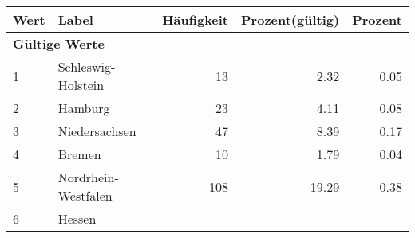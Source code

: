      \begin{longtable}{lXrrr}
     \toprule
     \textbf{Wert} & \textbf{Label} & \textbf{Häufigkeit} & \textbf{Prozent(gültig)} & \textbf{Prozent} \\
     \endhead
     \midrule
     \multicolumn{5}{l}{\textbf{Gültige Werte}}\\

     1 &
     \multicolumn{1}{X}{ Schleswig-Holstein   } &


       \num{13} &
       \num[round-mode=places,round-precision=2]{2,32} &
         \num[round-mode=places,round-precision=2]{0,05} \\

     2 &
     \multicolumn{1}{X}{ Hamburg   } &


       \num{23} &
       \num[round-mode=places,round-precision=2]{4,11} &
         \num[round-mode=places,round-precision=2]{0,08} \\

     3 &
     \multicolumn{1}{X}{ Niedersachsen   } &


       \num{47} &
       \num[round-mode=places,round-precision=2]{8,39} &
         \num[round-mode=places,round-precision=2]{0,17} \\

     4 &
     \multicolumn{1}{X}{ Bremen   } &


       \num{10} &
       \num[round-mode=places,round-precision=2]{1,79} &
         \num[round-mode=places,round-precision=2]{0,04} \\

     5 &
     \multicolumn{1}{X}{ Nordrhein-Westfalen   } &


       \num{108} &
       \num[round-mode=places,round-precision=2]{19,29} &
         \num[round-mode=places,round-precision=2]{0,38} \\

     6 &
     \multicolumn{1}{X}{ Hessen   } &



\end{longtable}
